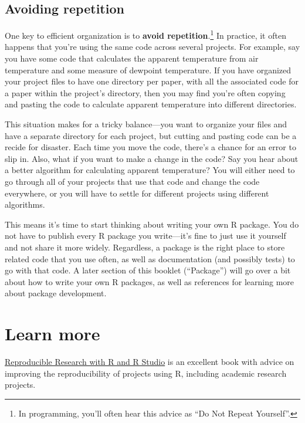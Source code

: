 \documentclass[]{tufte-book}
\begin{document}
\hypertarget{avoiding-repetition}{%
\subsection{Avoiding repetition}\label{avoiding-repetition}}

One key to efficient organization is to \textbf{avoid repetition}.\footnote{In programming,
  you'll often hear this advice as ``Do Not Repeat Yourself''.} In practice, it
often happens that you're using the same code across several projects. For
example, say you have some code that calculates the apparent temperature from
air temperature and some measure of dewpoint temperature. If you have organized
your project files to have one directory per paper, with all the associated code
for a paper within the project's directory, then you may find you're often
copying and pasting the code to calculate apparent temperature into different
directories.

This situation makes for a tricky balance---you want to organize your files and
have a separate directory for each project, but cutting and pasting code can be
a recide for disaster. Each time you move the code, there's a chance for an
error to slip in. Also, what if you want to make a change in the code? Say you
hear about a better algorithm for calculating apparent temperature? You will
either need to go through all of your projects that use that code and change the
code everywhere, or you will have to settle for different projects using
different algorithms.

This means it's time to start thinking about writing your own R package. You do
not have to publish every R package you write---it's fine to just use it
yourself and not share it more widely. Regardless, a package is the right place
to store related code that you use often, as well as documentation (and possibly
tests) to go with that code. A later section of this booklet (``Package'') will go
over a bit about how to write your own R packages, as well as references for
learning more about package development.

\hypertarget{learn-more}{%
\section{Learn more}\label{learn-more}}

\href{https://www.amazon.com/Reproducible-Research-Studio-Chapman-Hall/dp/1466572841}{Reproducible Research with R and R Studio} is an excellent book with advice on improving the reproducibility of
projects using R, including academic research projects.
\end{document}
